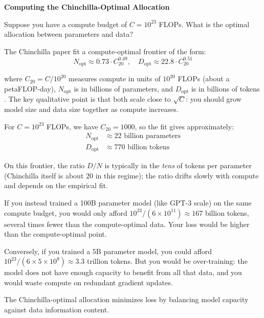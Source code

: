 \begin{examplebox}
\textbf{Computing the Chinchilla-Optimal Allocation}

\vspace{0.5em}

Suppose you have a compute budget of $C = 10^{23}$ FLOPs. What is the optimal allocation between parameters and data?

\vspace{0.5em}

The Chinchilla paper fit a compute-optimal frontier of the form:
\begin{equation}
N_{\text{opt}} \approx 0.73 \cdot C_{20}^{0.49}, \quad D_{\text{opt}} \approx 22.8 \cdot C_{20}^{0.51}
\end{equation}

where $C_{20} = C / 10^{20}$ measures compute in units of $10^{20}$ FLOPs (about a petaFLOP-day), $N_{\text{opt}}$ is in billions of parameters, and $D_{\text{opt}}$ is in billions of tokens \citep{hoffmann2022chinchilla}. The key qualitative point is that both scale close to $\sqrt{C}$: you should grow model size and data size together as compute increases.

\vspace{0.5em}

For $C = 10^{23}$ FLOPs, we have $C_{20} = 1000$, so the fit gives approximately:
\begin{align}
N_{\text{opt}} &\approx 22 \text{ billion parameters} \\
D_{\text{opt}} &\approx 770 \text{ billion tokens}
\end{align}

On this frontier, the ratio $D/N$ is typically in the \emph{tens} of tokens per parameter (Chinchilla itself is about 20 in this regime); the ratio drifts slowly with compute and depends on the empirical fit.

\vspace{0.5em}

If you instead trained a 100B parameter model (like GPT-3 scale) on the same compute budget, you would only afford $10^{23} / (6 \times 10^{11}) \approx 167$ billion tokens, several times fewer than the compute-optimal data. Your loss would be higher than the compute-optimal point.

\vspace{0.5em}

Conversely, if you trained a 5B parameter model, you could afford $10^{23} / (6 \times 5 \times 10^9) \approx 3.3$ trillion tokens. But you would be over-training: the model does not have enough capacity to benefit from all that data, and you would waste compute on redundant gradient updates.

\vspace{0.5em}

The Chinchilla-optimal allocation minimizes loss by balancing model capacity against data information content.
\end{examplebox}

